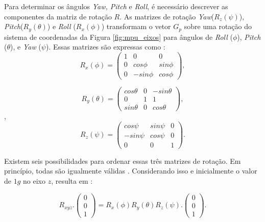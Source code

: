     Para determinar os ângulos \textit{Yaw, Pitch} e \textit{Roll}, é necessário descrever as componentes da matriz de rotação $R$. As matrizes de rotação \textit{Yaw}($R_z(\psi)$), \textit{Pitch}($R_y(\theta)$) e \textit{Roll} ($R_x(\phi)$) transformam o vetor $G_p$ sobre uma rotação do sistema de coordenadas da Figura \ref{fig:mpu_eixos}
    para ângulos de \textit{Roll} ($\phi$), \textit{Pitch} ($\theta$), e \textit{Yaw} ($\psi$). Essas matrizes são expressas como \cite{nxp:acell}:
    \begin{equation}
        R_x(\phi) = 
        \begin{pmatrix}
            1 & 0 & 0\\
            0 & cos \phi & sin \phi\\
            0 & -sin \phi & cos \phi
        \end{pmatrix}
        \label{eq:ROLL3}
        ,
    \end{equation}
    
    \begin{equation}
        R_y(\theta) = 
        \begin{pmatrix}
            cos \theta & 0 & -sin \theta \\
            0 & 1 & 1\\
            sin \theta & 0 & cos \theta
        \end{pmatrix}
        \label{eq:ROLL4}
        ,
    \end{equation}
    ,
    \begin{equation}
        R_z(\psi) = 
        \begin{pmatrix}
            cos \psi & sin \psi & 0 \\
            -sin \psi & cos \psi & 0 \\
            0 & 0 & 1
        \end{pmatrix}
        \label{eq:ROLL5}
        .
    \end{equation}
    
    Existem seis possibilidades para ordenar essas três matrizes de rotação. Em princípio, todas são igualmente válidas \cite{nxp:acell}. Considerando isso e inicialmente o valor de $1g$ no eixo $z$, resulta em  \cite{nxp:acell}:
    
    \begin{equation}
        R_{xyz}.
        \begin{pmatrix}
        0 \\ 0 \\ 1
        \end{pmatrix}
        = R_x(\phi) R_y(\theta) R_z(\psi).
        \begin{pmatrix}
            0 \\ 0 \\ 1
        \end{pmatrix}
        \label{eq:ROLL6}
        .
    \end{equation}
    
